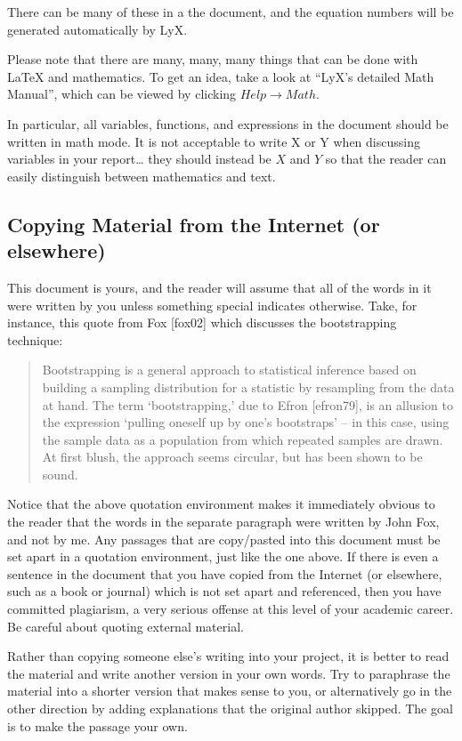 \documentclass[11pt]{article}
\begin{document}
There can be many of these in a the document, and the equation numbers
will be generated automatically by LyX.

Please note that there are many, many, many things that can be 
done with \LaTeX{} and mathematics. To get an idea, take a look at ``LyX's detailed Math Manual'', which can be viewed by clicking \(Help \rightarrow Math\). 

In particular, all variables, functions, and expressions in the
document should be written in math mode. It is not acceptable to write
X or Y when discussing variables in your report\ldots{} they should instead
be \(X\) and \(Y\) so that the reader can easily distinguish between
mathematics and text.
\subsection[Copying Material from the Internet (or elsewhere)]{Copying Material from the Internet (or elsewhere)}
\label{sec-3-2}

This document is yours, and the reader will assume that all of the
words in it were written by you unless something special indicates
otherwise. Take, for instance, this quote from Fox [fox02] which
discusses the bootstrapping technique:

\begin{quote}
Bootstrapping is a general approach to statistical inference based on
building a sampling distribution for a statistic by resampling from
the data at hand. The term ‘bootstrapping,’ due to Efron [efron79], is
an allusion to the expression `pulling oneself up by one’s bootstraps'
– in this case, using the sample data as a population from which
repeated samples are drawn. At first blush, the approach seems
circular, but has been shown to be sound.
\end{quote}

Notice that the above quotation environment makes it immediately
obvious to the reader that the words in the separate paragraph were
written by John Fox, and not by me. Any passages that are copy/pasted
into this document must be set apart in a quotation environment, just
like the one above. If there is even a sentence in the document that
you have copied from the Internet (or elsewhere, such as a book or
journal) which is not set apart and referenced, then you have
committed plagiarism, a very serious offense at this level of your
academic career. Be careful about quoting external material.

Rather than copying someone else's writing into your project, it is
better to read the material and write another version in your own
words. Try to paraphrase the material into a shorter version that
makes sense to you, or alternatively go in the other direction by
adding explanations that the original author skipped. The goal is to
make the passage your own.
\end{document}
